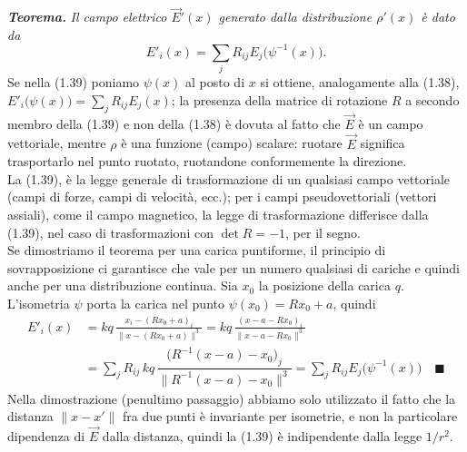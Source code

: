 \textbf{\textit{Teorema.}} \textit{Il campo elettrico $\vec E'(x)$ generato
dalla distribuzione $\rho'(x)$ \`e dato da}
\begin{equation}
  E'_i(x)=\textstyle\sum_j R_{ij}E_j\big(\psi^{-1}(x)\big).
  \tag{1.39}
\end{equation}
Se nella (1.39) poniamo $\psi(x)$ al posto di $x$ si ottiene, analogamente alla
(1.38), $E'_i\big(\psi(x)\big)=\sum_jR_{ij}E_j(x)$; la presenza della matrice di
rotazione $R$ a secondo membro della (1.39) e non della (1.38) \`e dovuta al
fatto che $\vec E$ \`e un campo vettoriale, mentre $\rho$ \`e una funzione
(campo) scalare: ruotare $\vec E$ significa trasportarlo nel punto ruotato,
ruotandone conformemente la direzione.\\
La (1.39), \`e la legge generale di trasformazione di un qualsiasi campo
vettoriale (campi di forze, campi di velocit\`a, ecc.); per i campi
pseudovettoriali (vettori assiali), come il campo magnetico, la legge di
trasformazione differisce dalla (1.39), nel caso di trasformazioni con
$\det R=-1$, per il segno.\\
Se dimostriamo il teorema per una carica puntiforme, il principio di
sovrapposizione ci garantisce che vale per un numero qualsiasi di cariche e
quindi anche per una distribuzione continua. Sia $x_0$ la posizione della carica
$q$. L'isometria $\psi$ porta la carica nel punto $\psi(x_0)=Rx_0+a$, quindi
\begin{equation}
  \begin{split}
    E'_i(x)&=kq\,\frac{x_i-(Rx_0+a)_i}{\|x-(Rx_0+a)\|^3}
    =kq\,\frac{(x-a-Rx_0)_i}{\|x-a-Rx_0\|^3}\\
    &=\textstyle\sum_jR_{ij}\,kq\,
    \dfrac{\big(R^{-1}(x-a)-x_0\big)_j}{\|R^{-1}(x-a)-x_0\|^3}
    =\sum_jR_{ij}E_j\big(\psi^{-1}(x)\big)\quad\blacksquare
  \end{split}
  \tag{1.40}
\end{equation}
Nella dimostrazione (penultimo passaggio) abbiamo solo utilizzato il fatto che
la distanza $\|x-x'\|$ fra due punti \`e invariante per isometrie, e non la
particolare dipendenza di $\vec E$ dalla distanza, quindi la (1.39) \`e
indipendente dalla legge $1/r^2$.

